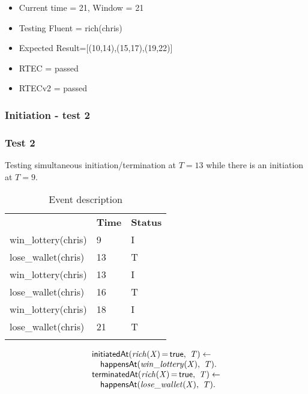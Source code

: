 \documentclass[8pt]{beamer}
\DeclareMathOperator{\val}{=}  %
\def \patsize {}
\def\happensAt{\textsf{\patsize happensAt}}
\def\initiatedAt{\textsf{\patsize initiatedAt}}
\def\terminatedAt{\textsf{\patsize terminatedAt}}
\def\true{\textsf{\patsize true}}
\newenvironment{mysplit}%
  {\arraycolsep 0pt \begin{array}{l}}%
  {\end{array}}
\begin{document}
\begin{frame}
    \begin{itemize}
        \item Current time = 21, Window = 21
        \item Testing Fluent = rich(chris)
        \item Expected Result=[(10,14),(15,17),(19,22)]
        \item RTEC = passed
        \item RTECv2 = passed
    \end{itemize}
\end{frame}
\begin{frame}
    \frametitle{Initiation - test 2}
    \subsubsection{Test 2}
    \small
    Testing simultaneous initiation/termination at $T=13$ while there is an initiation at $T=9$.
    \begin{minipage}{0.48\linewidth}
        \begin{table}[t!]
            \caption{Event description}
            \small
            \begin{center}
                \begin{tabular}{lll}
                    \hline\noalign{\smallskip}
                    \multicolumn{1}{l}{\textbf{Event}} & \multicolumn{1}{c}{\textbf{Time}}&\multicolumn{1}{l}{\textbf{Status}}   \\
                    win\_lottery(chris)& 9 &I\\
                    lose\_wallet(chris)& 13&T\\
                    win\_lottery(chris)& 13&I\\
                    lose\_wallet(chris)& 16&T\\
                    win\_lottery(chris)& 18&I\\
                    lose\_wallet(chris)& 21&T\\
                    \noalign{\smallskip}
                    \hline
                \end{tabular}
            \end{center}
        \end{table}
    \end{minipage}
    \begin{minipage}{0.48\linewidth}


        \begin{align*}
            \begin{mysplit}
                \initiatedAt\mathit{(rich(X)\val\true,\ T) \leftarrow}\\
                \quad    \happensAt\mathit{(win\_lottery(X),\ T).}\\
                \terminatedAt\mathit{(rich(X)\val\true,\ T) \leftarrow}\\
                \quad    \happensAt\mathit{(lose\_wallet(X),\ T)}.\\
            \end{mysplit}
        \end{align*}


\end{minipage}
\end{frame}
\end{document}
